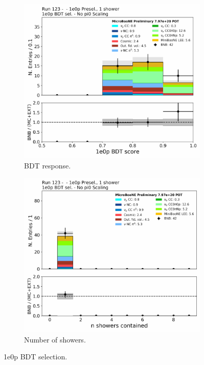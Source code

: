 \begin{figure}[H]
\begin{center}
\begin{subfigure}[b]{0.3\textwidth}
    \includegraphics[width=1.00\textwidth]{Fakedata/set2/zp_postsel_bdt.pdf}
    \caption{\label{fig:fakedata:set2:zp_postsel_bdt} BDT response.}
    \end{subfigure}
    \begin{subfigure}[b]{0.3\textwidth}
    \centering
    \includegraphics[width=1.00\textwidth]{Fakedata/set2/zp_postsel_nshr.pdf}
    \caption{\label{fig:fakedata:set2:zp_postsel_nshr} Number of showers.}
    \end{subfigure}
\caption{\label{fig:fakedata:set2:zpsel} 1e0p BDT selection.}
\end{center}
\end{figure}

